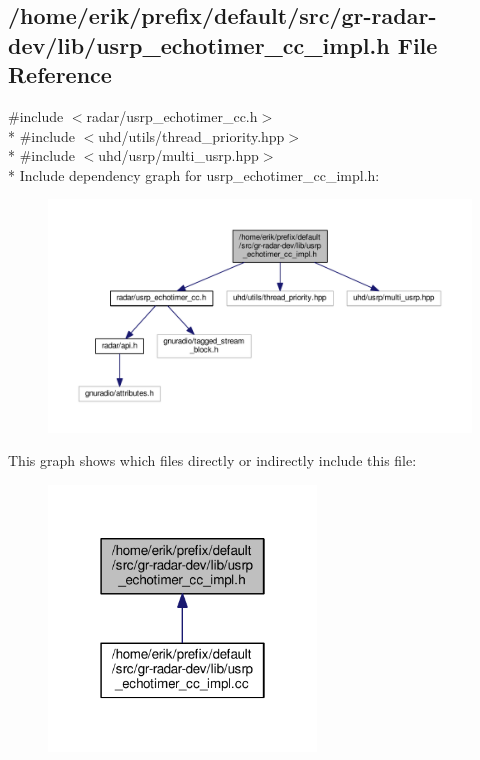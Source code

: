 \subsection{/home/erik/prefix/default/src/gr-\/radar-\/dev/lib/usrp\+\_\+echotimer\+\_\+cc\+\_\+impl.h File Reference}
\label{usrp__echotimer__cc__impl_8h}
{\ttfamily \#include $<$radar/usrp\+\_\+echotimer\+\_\+cc.\+h$>$}\\*
{\ttfamily \#include $<$uhd/utils/thread\+\_\+priority.\+hpp$>$}\\*
{\ttfamily \#include $<$uhd/usrp/multi\+\_\+usrp.\+hpp$>$}\\*
Include dependency graph for usrp\+\_\+echotimer\+\_\+cc\+\_\+impl.\+h\+:
\nopagebreak
\begin{figure}[H]
\begin{center}
\leavevmode
\includegraphics[width=350pt]{d6/d49/usrp__echotimer__cc__impl_8h__incl}
\end{center}
\end{figure}
This graph shows which files directly or indirectly include this file\+:
\nopagebreak
\begin{figure}[H]
\begin{center}
\leavevmode
\includegraphics[width=202pt]{d5/d4e/usrp__echotimer__cc__impl_8h__dep__incl}
\end{center}
\end{figure}
